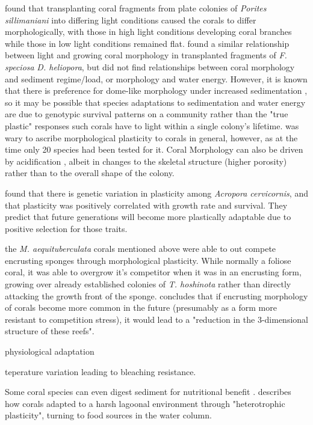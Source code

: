 \documentclass[11pt,a4paper]{article}
\begin{document}
\cite{Muko2000} found that transplanting coral fragments from plate colonies of \textit{Porites sillimaniani} into differing light conditions caused the corals to differ morphologically, with those in high light conditions developing coral branches while those in low light conditions remained flat. \cite{Todd2004} found a similar relationship between light and growing coral morphology in transplanted fragments of \textit{F. speciosa} \textit{D. heliopora}, but did not find relationships between coral morphology and sediment regime/load, or morphology and water energy. However, it is known that there is preference for dome-like morphology under increased sedimentation \citep{Stafford1992}, so it may be possible that species adaptations to sedimentation and water energy are due to genotypic survival patterns on a community rather than the "true plastic" responses such corals have to light within a single colony's lifetime. \cite{Todd2008} was wary to ascribe morphological plasticity to corals in general, however, as at the time only 20 species had been tested for it. Coral Morphology can also be driven by acidification \citep{Tambutte2015,Alison2022}, albeit in changes to the skeletal structure (higher porosity) rather than to the overall shape of the colony.

\cite{Million} found that there is genetic variation in plasticity among \textit{Acropora cervicornis}, and that plasticity was positively correlated with growth rate and survival. They predict that future generations will become more plastically adaptable due to positive selection for those traits. 

the \textit{M. aequituberculata} corals mentioned above \citep{Elliot2016} were able to out compete encrusting sponges through morphological plasticity. While normally a foliose coral, it was able to overgrow it's competitor when it was in an encrusting form, growing over already established colonies of \textit{T. hoshinota} rather than directly attacking the growth front of the sponge. \cite{Elliot2016} concludes that if encrusting morphology of corals become more common in the future (presumably as a form more resistant to competition stress), it would lead to a "reduction in the 3-dimensional structure of these reefs".

\cite{Hennige2008} physiological adaptation

\cite{Safaie2018} teperature variation leading to bleaching resistance.



Some coral species can even digest sediment for nutritional benefit \citep{Rosenfeld1999}. \cite{Camp2017} describes how corals  adapted to a harsh lagoonal environment through "heterotrophic plasticity", turning to food sources in the water column. 
\end{document}
